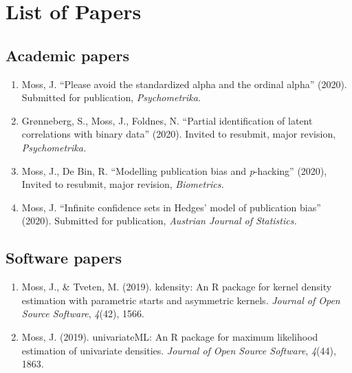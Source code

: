 \chapter{List of Papers}
\section*{Academic papers}
\begin{enumerate}

\item Moss, J. ``Please avoid the standardized alpha and the ordinal alpha''
(2020). Submitted for publication, \emph{Psychometrika.}

\item Grønneberg, S., Moss, J., Foldnes, N. ``Partial identification of
latent correlations with binary data'' (2020). Invited to resubmit, major revision, \emph{Psychometrika.}

\item Moss, J., De Bin, R. ``Modelling publication bias and \emph{p}-hacking''
(2020), Invited to resubmit, major revision, \emph{Biometrics.}

\item Moss, J. ``Infinite confidence sets in Hedges' model of publication
bias'' (2020). Submitted for publication, \emph{Austrian Journal of Statistics.}

\end{enumerate}

\section*{Software papers}
\begin{enumerate}
\item Moss, J., \& Tveten, M. (2019). kdensity: An R package for kernel
density estimation with parametric starts and asymmetric kernels.
\emph{Journal of Open Source Software}, \emph{4}(42), 1566.
\item Moss, J. (2019). univariateML: An R package for maximum likelihood
estimation of univariate densities. \emph{Journal of Open Source Software},
\emph{4}(44), 1863.
\end{enumerate}
